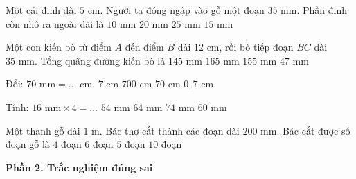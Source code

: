 \begin{ex} %
Một cái đinh dài $5\text{ cm}$. Người ta đóng ngập vào gỗ một đoạn $35\text{ mm}$. Phần đinh còn nhô ra ngoài dài là
\choice
{$10\text{ mm}$}
{$20\text{ mm}$}
{$25\text{ mm}$}
{\True $15\text{ mm}$}
\end{ex}

\begin{ex} %
Một con kiến bò từ điểm $A$ đến điểm $B$ dài $12\text{ cm}$, rồi bò tiếp đoạn $BC$ dài $35\text{ mm}$. Tổng quãng đường kiến bò là
\choice
{$145\text{ mm}$}
{$165\text{ mm}$}
{\True $155\text{ mm}$}
{$47\text{ mm}$}
\end{ex}

\begin{ex} %
Đổi: $70\text{ mm} = \dots\text{ cm}$.
\choice
{\True $7\text{ cm}$}
{$700\text{ cm}$}
{$70\text{ cm}$}
{$0{,}7\text{ cm}$}
\end{ex}

\begin{ex} %
Tính: $16\text{ mm} \times 4 = \dots$
\choice
{$54\text{ mm}$}
{\True $64\text{ mm}$}
{$74\text{ mm}$}
{$60\text{ mm}$}
\end{ex}

\begin{ex} %
Một thanh gỗ dài $1\text{ m}$. Bác thợ cắt thành các đoạn dài $200\text{ mm}$. Bác cắt được số đoạn gỗ là
\choice
{$4$ đoạn}
{$6$ đoạn}
{\True $5$ đoạn}
{$10$ đoạn}
\end{ex}

\textbf{Phần 2. Trắc nghiệm đúng sai}

